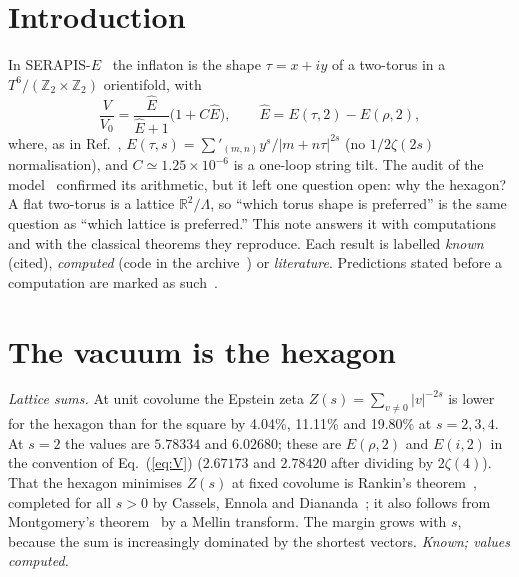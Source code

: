 \documentclass[aps,prd,twocolumn,superscriptaddress,nofootinbib,showkeys]{revtex4-2}
\begin{document}
\section{Introduction}
In SERAPIS-$E$~\cite{P3} the inflaton is the shape $\tau=x+iy$ of a two-torus in a $T^6/(\mathbb Z_2\times\mathbb Z_2)$ orientifold, with
\begin{equation}
\frac{V}{V_0}=\frac{\hat E}{\hat E+1}\bigl(1+C\hat E\bigr),\qquad \hat E=E(\tau,2)-E(\rho,2),
\label{eq:V}
\end{equation}
where, as in Ref.~\cite{P3}, $E(\tau,s)=\sum'_{(m,n)}y^s/|m+n\tau|^{2s}$ (no $1/2\zeta(2s)$ normalisation), and $C\simeq1.25\times10^{-6}$ is a one-loop string tilt. The audit of the model~\cite{P5} confirmed its arithmetic, but it left one question open: why the hexagon? A flat two-torus is a lattice $\mathbb R^2/\Lambda$, so ``which torus shape is preferred'' is the same question as ``which lattice is preferred.'' This note answers it with computations and with the classical theorems they reproduce. Each result is labelled \emph{known} (cited), \emph{computed} (code in the archive~\cite{AEGIS}) or \emph{literature}. Predictions stated before a computation are marked as such~\cite{P4}.

\section{The vacuum is the hexagon}
\emph{Lattice sums.} At unit covolume the Epstein zeta $Z(s)=\sum_{v\neq0}|v|^{-2s}$ is lower for the hexagon than for the square by 4.04\%, 11.11\% and 19.80\% at $s=2,3,4$. At $s=2$ the values are $5.78334$ and $6.02680$; these are $E(\rho,2)$ and $E(i,2)$ in the convention of Eq.~(\ref{eq:V}) ($2.67173$ and $2.78420$ after dividing by $2\zeta(4)$). That the hexagon minimises $Z(s)$ at fixed covolume is Rankin's theorem~\cite{Rankin}, completed for all $s>0$ by Cassels, Ennola and Diananda~\cite{Cassels,Ennola,Diananda}; it also follows from Montgomery's theorem~\cite{Montgomery} by a Mellin transform. The margin grows with $s$, because the sum is increasingly dominated by the shortest vectors. \emph{Known; values computed.}
\end{document}
